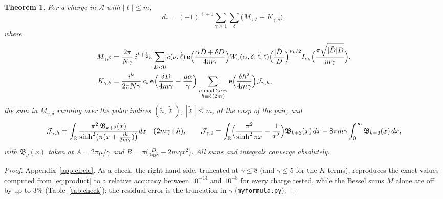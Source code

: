 \documentclass[11pt]{amsart}
\numberwithin{equation}{section}
\theoremstyle{plain}
\newtheorem{thm}{Theorem}[section]
\theoremstyle{definition}
\theoremstyle{remark}
\newcommand{\R}{\mathbb{R}}
\newcommand{\cA}{\mathcal{A}}
\newcommand{\e}{\mathbf{e}}
\begin{document}
\begin{thm}\label{thm:exp}
For a charge in $\cA$ with $|\ell|\le m$,
\[
d_*=(-1)^{\ell+1}\sum_{\gamma\ge1}\sum_{\delta}\bigl(M_{\gamma,\delta}+K_{\gamma,\delta}\bigr),
\]
where
\begin{align*}
M_{\gamma,\delta}&=\frac{2\pi}{N\gamma}\,i^{k+\frac12}\varepsilon\sum_{\tilde D<0}c(\nu,\tilde\ell)\,\e\Bigl(\frac{\alpha\tilde D+\delta D}{4m\gamma}\Bigr)W_\gamma(\alpha,\delta;\tilde\ell,\ell)\Bigl(\frac{|\tilde D|}{D}\Bigr)^{\nu_k/2}I_{\nu_k}\Bigl(\frac{\pi\sqrt{|\tilde D|D}}{m\gamma}\Bigr),\\
K_{\gamma,\delta}&=\frac{i^k}{2\pi N\gamma}\,c_*\,\e\Bigl(\frac{\delta D}{4m\gamma}-\frac{\mu\alpha}{\gamma}\Bigr)\sum_{\substack{h\bmod2m\gamma\\h\equiv\ell\,(2m)}}\e\Bigl(\frac{\delta h^2}{4m\gamma}\Bigr)\mathcal J_{\gamma,h},
\end{align*}
the sum in $M_{\gamma,\delta}$ running over the polar indices $(\tilde n,\tilde\ell)$, $|\tilde\ell|\le m$, at the cusp of the pair, and
\[
\mathcal J_{\gamma,h}=\int_\R\frac{\pi^2\,\mathfrak B_{k+2}(x)}{\sinh^2\bigl(\pi(x+\frac{ih}{2m\gamma})\bigr)}dx\quad(2m\gamma\nmid h),\qquad
\mathcal J_{\gamma,0}=\int_\R\Bigl(\frac{\pi^2}{\sinh^2\pi x}-\frac1{x^2}\Bigr)\mathfrak B_{k+2}(x)\,dx-8\pi m\gamma\int_0^\infty\mathfrak B_{k+3}(x)\,dx,
\]
with $\mathfrak B_\nu(x)$ taken at $A=2\pi\mu/\gamma$ and $B=\pi\bigl(\frac{D}{2m\gamma}-2m\gamma x^2\bigr)$. All sums and integrals converge absolutely.
\end{thm}

\begin{proof}
Appendix~\ref{app:circle}. As a check, the right-hand side, truncated at $\gamma\le8$ (and $\gamma\le5$ for the $K$-terms), reproduces the exact values computed from \eqref{eq:product} to a relative accuracy between $10^{-14}$ and $10^{-8}$ for every charge tested, while the Bessel sums $M$ alone are off by up to $3\%$ (Table~\ref{tab:check}); the residual error is the truncation in $\gamma$ (\texttt{myformula.py}).
\end{proof}
\end{document}
